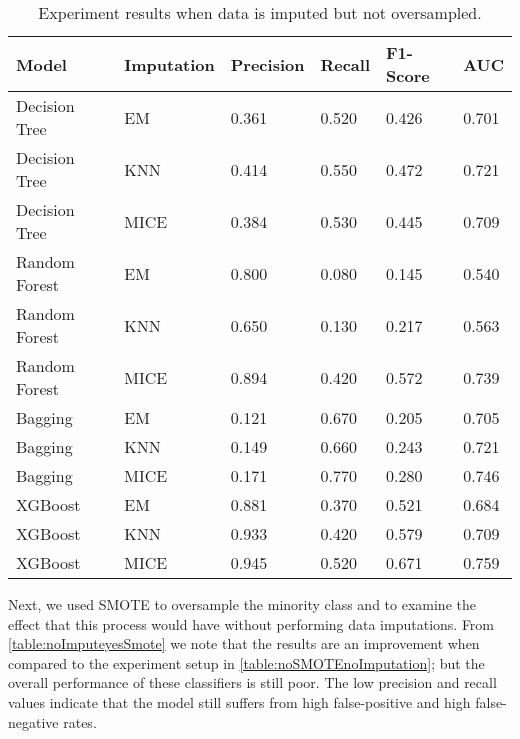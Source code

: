 \begin{table}
\begin{center}
 \begin{tabular}{ | p{3cm} | p{2cm} | p{1.75cm}| p{1.75cm} | p{1.75cm}| p{1.75cm} | }
 \hline
  Model & Imputation &  Precision  & Recall & F1-Score & AUC

  \\ [0.5ex] 
 \hline\hline

    Decision Tree & EM & 0.361 & 0.520 & 0.426 & 0.701 \\ \hline
    Decision Tree & KNN & 0.414 & 0.550 & 0.472 & 0.721 \\ \hline
    Decision Tree & MICE & 0.384 & 0.530 & 0.445 & 0.709 \\ \hline
    Random Forest & EM & 0.800 & 0.080 & 0.145 & 0.540 \\ \hline
    Random Forest & KNN & 0.650 & 0.130 & 0.217 & 0.563 \\ \hline
    Random Forest & MICE & 0.894 & 0.420 & 0.572 & 0.739 \\ \hline
    Bagging & EM & 0.121 & 0.670 & 0.205 & 0.705 \\ \hline
    Bagging & KNN & 0.149 & 0.660 & 0.243 & 0.721 \\ \hline
    Bagging & MICE & 0.171 & 0.770 & 0.280 & 0.746 \\ \hline
    XGBoost & EM & 0.881 & 0.370 & 0.521 & 0.684 \\ \hline
    XGBoost & KNN & 0.933 & 0.420 & 0.579 & 0.709 \\ \hline
    XGBoost & MICE & 0.945 & 0.520 & 0.671 & 0.759 \\ \hline
\end{tabular}
\end{center}

    \caption{Experiment results when data is imputed but not oversampled.}
\label{table:yesImputenoSMOTE}
\end{table}




Next, we used SMOTE to oversample the minority class and to examine the effect that this process would have without performing data imputations. From \autoref{table:noImputeyesSmote} we note that the results are an improvement when compared to the experiment setup in  \autoref{table:noSMOTEnoImputation}; but the overall performance of these classifiers is still poor. The low precision and recall values indicate that the model still suffers from high false-positive and high false-negative rates.

